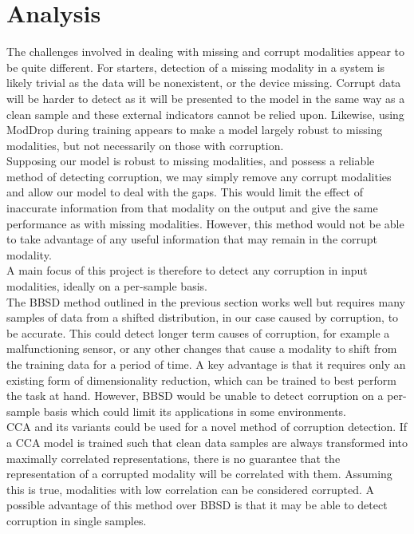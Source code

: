 \chapter{Analysis}
The challenges involved in dealing with missing and corrupt modalities appear to be quite different. For starters, detection of a missing modality in a system is likely trivial as the data will be nonexistent, or the device missing. Corrupt data will be harder to detect as it will be presented to the model in the same way as a clean sample and these external indicators cannot be relied upon. Likewise, using ModDrop \cite{ModDrop} during training appears to make a model largely robust to missing modalities, but not necessarily on those with corruption.\\

Supposing our model is robust to missing modalities, and possess a reliable method of detecting corruption, we may simply remove any corrupt modalities and allow our model to deal with the gaps. This would limit the effect of inaccurate information from that modality on the output and give the same performance as with missing modalities. However, this method would not be able to take advantage of any useful information that may remain in the corrupt modality.\\

A main focus of this project is therefore to detect any corruption in input modalities, ideally on a per-sample basis.\\

The BBSD method outlined in the previous section works well but requires many samples of data from a shifted distribution, in our case caused by corruption, to be accurate. This could detect longer term causes of corruption, for example a malfunctioning sensor, or any other changes that cause a modality to shift from the training data for a period of time. A key advantage is that it requires only an existing form of dimensionality reduction, which can be trained to best perform the task at hand. However, BBSD would be unable to detect corruption on a per-sample basis which could limit its applications in some environments.\\

CCA and its variants could be used for a novel method of corruption detection. If a CCA model is trained such that clean data samples are always transformed into maximally correlated representations, there is no guarantee that the representation of a corrupted modality will be correlated with them. Assuming this is true, modalities with low correlation can be considered corrupted. A possible advantage of this method over BBSD is that it may be able to detect corruption in single samples.\\

